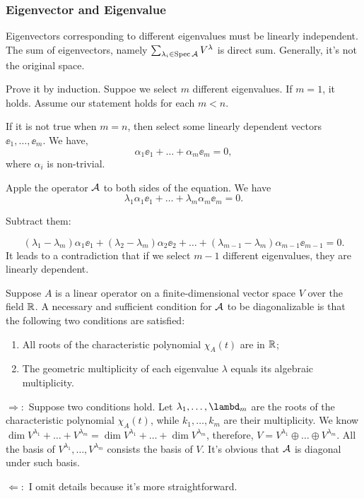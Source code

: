 \documentclass[12pt]{article}
\begin{document}
\subsubsection{Eigenvector and Eigenvalue}

\begin{Theorem}
  Eigenvectors corresponding to different
  eigenvalues must be linearly independent.
  The sum of eigenvectors, namely
  $\sum_{\lambda_i \in \operatorname{Spec}{\mathcal{A}}} V^\lambda$ is
  direct sum.
  Generally, it's not the original space.
\end{Theorem}

\begin{Proof}
  Prove it by induction. Suppoe we select
  $m$ different eigenvalues.
  If $m=1$, it holds.
  Assume our statement holds for each $m < n$.

  If it is not true when $m = n$, then select
  some linearly dependent vectors $\ee_1,\dots,
  \ee_m$. We have,
  $$
  \alpha_1 \ee_1 + \dots + \alpha_m \ee_m=0,
  $$
  where $\alpha_i$ is non-trivial.

  Apple the operator $\mathcal{A}$ to both sides of
  the equation. We have
  $$
  \lambda_1 \alpha_1 \ee_1 + \dots + \lambda_m
  \alpha_m \ee_m = 0.
  $$

  Subtract them:

  $$
  (\lambda_1 - \lambda_m)\alpha_1 \ee_1 +
  (\lambda_2 - \lambda_m)\alpha_2 \ee_2 + \dots
  + (\lambda_{m-1} - \lambda_m)\alpha_{m-1}
  \ee_{m-1} = 0.
  $$
  It leads to a contradiction that if we
  select $m-1$ different eigenvalues, they are
  linearly dependent.
\end{Proof}


\begin{Theorem}[Diagonalizable]
  \label{thm:Diagonal}
  Suppose \( A \) is a linear operator on a finite-dimensional vector space \( V \) over the field \( \mathbb{R} \).  
  A necessary and sufficient condition for \(
  \mathcal{A} \) to be diagonalizable is that the following two conditions are satisfied:

\begin{enumerate}
    \item All roots of the characteristic polynomial \( \chi_A(t) \) are in \( \mathbb{R} \);
    \item The geometric multiplicity of each eigenvalue \( \lambda \) equals its algebraic multiplicity.
\end{enumerate}
\end{Theorem}

\begin{Proof}
  $\Rightarrow:$ Suppose two conditions hold.
  Let $\lambda_1, \dots, \lambd_m$ are the
  roots of the characteristic polynomial
  $\chi_A(t)$, while $k_1, \dots, k_m$ are
  their multiplicity. We know $\dim{
    V^{\lambda_1} + \dots + V^{\lambda_m}} =
  \dim{V^{\lambda_1}} + \dots +
  \dim{V^{\lambda_m}}$, therefore, $V =
  V^{\lambda_1} \oplus \dots\oplus V^{\lambda_m}$.
  All the basis of $V^{\lambda_1}, \dots,
  V^{\lambda_m}$ consists the basis of $V$.
  It's obvious that $\mathcal{A}$ is diagonal under
  such basis.

  $\Leftarrow:$ I omit details because it's
  more straightforward.  
\end{Proof}
\end{document}
